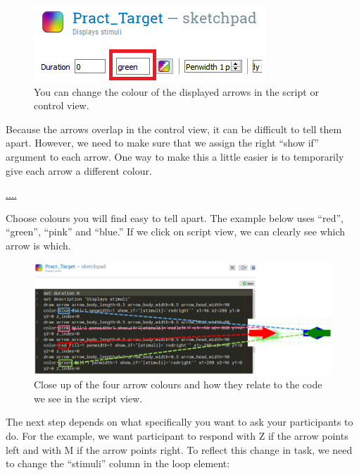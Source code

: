 \documentclass[
]{book}
\begin{document}
\begin{figure}

{\centering \includegraphics[width=0.6\linewidth]{images/changesimon/03SimonColour} 

}

\caption{You can change the colour of the displayed arrows in the script or control view.}\label{fig:Figure3-9}
\end{figure}

Because the arrows overlap in the control view, it can be difficult to tell them apart. However, we need to make sure that we assign the right ``show if'' argument to each arrow. One way to make this a little easier is to temporarily give each arrow a different colour.

\url{....}

Choose colours you will find easy to tell apart. The example below uses ``red'', ``green'', ``pink'' and ``blue.'' If we click on script view, we can clearly see which arrow is which.

\begin{figure}

{\centering \includegraphics[width=0.99\linewidth]{images/changesimon/04colours} 

}

\caption{Close up of the four arrow colours and how they relate to the code we see in the script view.}\label{fig:Figure3-11}
\end{figure}

The next step depends on what specifically you want to ask your participants to do. For the example, we want participant to respond with Z if the arrow points left and with M if the arrow points right. To reflect this change in task, we need to change the ``stimuli'' column in the loop element:
\end{document}
